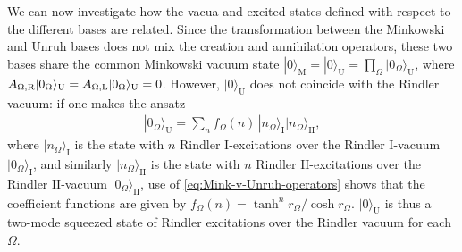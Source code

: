 We can now investigate how the vacua and excited states 
defined with respect to the different bases are related. Since the transformation between the Minkowski and Unruh bases does not mix the creation and annihilation operators, these two bases share the common Minkowski vacuum state $|0\rangle_{\text{M}}=|0\rangle_\text{U}=\prod_{\Omega}|0_{\Omega}\rangle_\text{U}$, where $A_{\Omega,\text{\text{R}}}|0_{\Omega}\rangle_\text{U}=A_{\Omega,\text{\text{L}}}|0_{\Omega}\rangle_\text{U}=0$. However, $|0\rangle_\text{U}$ does not 
coincide with the Rindler vacuum: 
if one makes the ansatz 
\begin{align}
\label{eq:UOmegavac-expansion}
|0_{\Omega}\rangle_\text{U}= \sum_n f_{\Omega}(n) \, |n_{\Omega}\rangle_\text{I} |n_{\Omega}\rangle_\text{II}, 
\end{align}
where $|n_{\Omega}\rangle_\text{I}$
is the state with $n$ Rindler $\text{I}$-excitations 
over the Rindler $\text{I}$-vacuum $|0_{\Omega}\rangle_\text{I}$, and 
similarly 
$|n_{\Omega}\rangle_\text{II}$
is the state with $n$ Rindler $\text{II}$-excitations 
over the Rindler $\text{II}$-vacuum $|0_{\Omega}\rangle_\text{II}$,
use of \eqref{eq:Mink-v-Unruh-operators} shows that the 
coefficient functions are given by 
$f_{\Omega}(n) =\tanh^n \! r_{\Omega}/\cosh r_\Omega$. 
$|0\rangle_\text{U}$ is thus a two-mode squeezed state of Rindler excitations over the Rindler vacuum for each~$\Omega$.  


